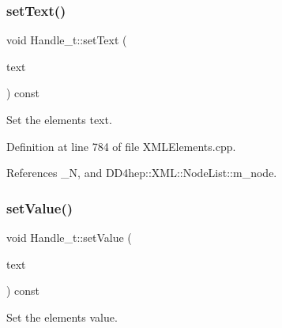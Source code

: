 \hypertarget{class_d_d4hep_1_1_x_m_l_1_1_handle__t_a53612b8b4780ef110da05787bad5b33d}{}\label{class_d_d4hep_1_1_x_m_l_1_1_handle__t_a53612b8b4780ef110da05787bad5b33d} 
\subsubsection{\texorpdfstring{set\+Text()}{setText()}\hspace{0.1cm}{\footnotesize\ttfamily [2/2]}}
{\footnotesize\ttfamily void Handle\+\_\+t\+::set\+Text (\begin{DoxyParamCaption}\item[{const std\+::string \&}]{text }\end{DoxyParamCaption}) const}



Set the element\textquotesingle{}s text. 



Definition at line 784 of file X\+M\+L\+Elements.\+cpp.



References \+\_\+N, and D\+D4hep\+::\+X\+M\+L\+::\+Node\+List\+::m\+\_\+node.

\hypertarget{class_d_d4hep_1_1_x_m_l_1_1_handle__t_a93135135a8503cb47ba4ede43c7dab59}{}\label{class_d_d4hep_1_1_x_m_l_1_1_handle__t_a93135135a8503cb47ba4ede43c7dab59} 
\subsubsection{\texorpdfstring{set\+Value()}{setValue()}\hspace{0.1cm}{\footnotesize\ttfamily [1/2]}}
{\footnotesize\ttfamily void Handle\+\_\+t\+::set\+Value (\begin{DoxyParamCaption}\item[{const \hyperlink{namespace_d_d4hep_1_1_x_m_l_a09e5d9cc86ed782f6826dfe0778c1815}{Xml\+Char} $\ast$}]{text }\end{DoxyParamCaption}) const}



Set the element\textquotesingle{}s value. 



